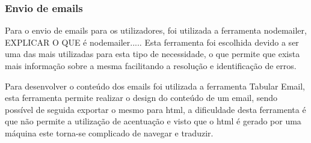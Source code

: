 \subsubsection{Envio de emails}
Para o envio de emails para os utilizadores, foi utilizada a ferramenta nodemailer, EXPLICAR O QUE é nodemailer..... Esta ferramenta foi escolhida devido a ser uma das mais utilizadas para esta tipo de necessidade, o que permite que exista mais informação sobre a mesma facilitando a resolução e identificação de erros. 

Para desenvolver o conteúdo dos emails foi utilizada a ferramenta Tabular Email, esta ferramenta permite realizar o design do conteúdo de um email, sendo possível de seguida exportar o mesmo para html, a dificuldade desta ferramenta é que não permite a utilização de acentuação e visto que o html é gerado por uma máquina este torna-se complicado de navegar e traduzir.
